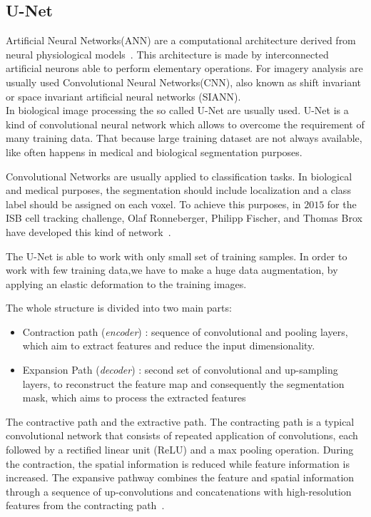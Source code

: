 \documentclass{standalone}
\begin{document}
		\subsection{U-Net}
		
		Artificial Neural Networks(ANN) are a computational architecture derived from neural physiological models~\cite{INP:Withey}. This architecture is made by interconnected artificial neurons able to perform elementary operations.  For imagery analysis are usually used Convolutional Neural Networks(CNN), also known as shift invariant or space invariant artificial neural networks (SIANN).\\
			
	
		In biological image processing 	the so called U-Net are usually used. U-Net is a kind of convolutional neural network which allows to overcome the requirement of many training data. That because large training dataset are not always available, like often happens in medical and biological segmentation purposes.
		
		Convolutional Networks are usually applied to classification tasks. In biological and medical purposes, the segmentation should include localization and a class label should be assigned on each voxel.
		To achieve this purposes, in $2015$ for the ISB cell tracking challenge, Olaf Ronneberger, Philipp Fischer, and Thomas Brox have developed this kind of network~\cite{ART:Johannes}.
		
		The U-Net is able to work with only small set of training samples. 	In order to work with few training data,we have to make a huge data augmentation, by applying an elastic deformation to the training images.
	
		The whole structure is divided into two main parts:
		\begin{itemize}
			\item Contraction path (\textit{encoder}) : sequence of convolutional and pooling layers, which aim
			to extract features and reduce the input dimensionality. 
			
			\item Expansion Path (\textit{decoder}) : second set of convolutional and up-sampling layers, to reconstruct the
			feature map and consequently the segmentation mask, which aims to process the extracted features
		\end{itemize}
	
		The contractive path and the extractive path. The contracting path is a typical convolutional network that consists of repeated application of convolutions, each followed by a rectified linear unit (ReLU) and a max pooling operation. During the contraction, the spatial information is reduced while feature information is increased. The expansive pathway combines the feature and spatial information through a sequence of up-convolutions and concatenations with high-resolution features from the contracting path~\cite{ART:Johannes}.
		
\end{document}
